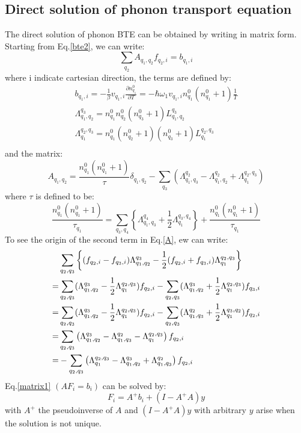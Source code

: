 \documentclass{article}
\newcommand{\pfrac}[2]{\frac{\partial #1}{\partial #2}}
\begin{document}
\subsection{Direct solution of phonon transport equation}
The direct solution of phonon BTE can be obtained by writing in matrix form. Starting from
Eq.\ref{bte2}, we can write:
\begin{equation}
    \sum_{q_2} A_{q_1,q_2} f_{q_2,i} = b_{q_1,i} \label{matrix1}
\end{equation}
where i indicate cartesian direction, the terms are defined by:
\begin{gather}
    b_{q_1,i} = - \frac{1}{\beta} v_{q_1,i} \pfrac{n_{q_1}^0}{T} = -\hbar \omega_1 v_{q_1,i} n_{q_1}^0 (n_{q_1}^0 + 1) \frac{1}{T} \\
    \Lambda_{q_1,q_2}^{q_3} = n_{q_1}^0 n_{q_2}^0 (n_{q_3}^0 + 1) L_{q_1,q_2}^{q_3} \\
    \Lambda^{q_2,q_3}_{q_1} = n_{q_1}^0 (n_{q_2}^0+1) (n_{q_3}^0 + 1) L^{q_2,q_3}_{q_1} \\
\end{gather}
and the matrix:
\begin{equation}
    A_{q_1,q_2} = \frac{n_{q_1}^0 (n_{q_1}^0 + 1)}{\tau} \delta_{q_1,q_2} 
            - \sum_{q_3} \left( \Lambda_{q_1,q_3}^{q_2} -  \Lambda_{q_1,q_2}^{q_2} + \Lambda^{q_2,q_3}_{q_1} \right) \label{A}
\end{equation}
where $\tau$ is defined to be:
\begin{equation}
    \frac{n_{q_1}^0 (n_{q_1}^0 + 1)}{\tau_{q_1}} = 
    \sum_{q_3,q_4} \left\{ \Lambda_{q_1,q_3}^{q_{4}} + \frac{1}{2} \Lambda^{q_3,q_{4}}_{q_1} \right\} 
    + \frac{n_{q_1}^0(n_{q_1}^0+1)}{\tau_{q_1}}
\end{equation}
To see the origin of the second term in Eq.\ref{A}, ew can write:
\begin{align}
        &\sum_{q_2,q_3} \left\{ (f_{q_2,i} - f_{q_3,i}) \Lambda_{q_1,q_2}^{q_3} - \frac{1}{2} (f_{q_2,i} + f_{q_3,i}) \Lambda_{q_1}^{q_2,q_3}  \right\} \notag \\
    = &\sum_{q_2,q_3} (\Lambda_{q_1,q_2}^{q_3} - \frac{1}{2}\Lambda_{q_1}^{q_2,q_3} ) f_{q_2,i} 
        - \sum_{q_2,q_3} (\Lambda_{q_1,q_2}^{q_3} + \frac{1}{2}\Lambda_{q_1}^{q_2,q_3} ) f_{q_3,i} \notag \\ 
    = &\sum_{q_2,q_3} (\Lambda_{q_1,q_2}^{q_3} - \frac{1}{2}\Lambda_{q_1}^{q_2,q_3} ) f_{q_2,i} 
        - \sum_{q_2,q_3} (\Lambda_{q_1,q_3}^{q_2} + \frac{1}{2}\Lambda_{q_1}^{q_3,q_2} ) f_{q_2,i} \notag \\ 
    = &\sum_{q_2,q_3} \left( \Lambda_{q_1,q_2}^{q_3} - \Lambda_{q_1,q_3}^{q_2} - \Lambda_{q_1}^{q_2,q_3} \right) f_{q_2,i} \notag \\
    = &- \sum_{q_2,q_3} \left( \Lambda_{q_1}^{q_2,q_3} - \Lambda_{q_1,q_2}^{q_3} + \Lambda_{q_1,q_3}^{q_2} \right) f_{q_2,i}
\end{align}
Eq.\ref{matrix1} $(AF_i = b_i)$ can be solved by:
\begin{equation}
    F_i = A^{+}b_i + (I - A^{+}A) y
\end{equation}
with $A^{+}$ the pseudoinverse of $A$ and $(I - A^{+}A) y$ with arbitrary $y$ arise
when the solution is not unique.
\end{document}
